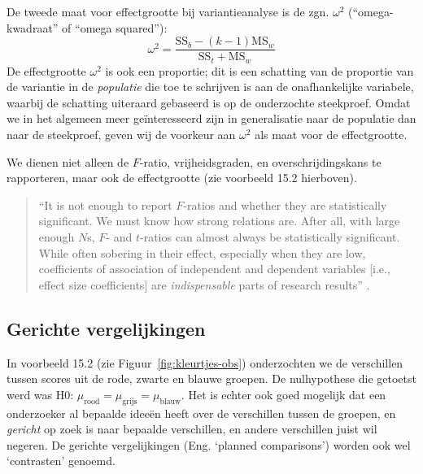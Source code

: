 \documentclass[
]{book}
\begin{document}
De tweede maat voor effectgrootte bij variantieanalyse is de zgn.
\(\omega^2\) (``omega-kwadraat'' of ``omega squared''):
\begin{equation}
  \label{eq:omegasq}
    \omega^2 = \frac{ \textrm{SS}_b - (k-1) \textrm{MS}_w} { \textrm{SS}_t + \textrm{MS}_w }
\end{equation}
De effectgrootte \(\omega^2\) is ook een proportie; dit is een schatting
van de proportie van de variantie in de \emph{populatie} die toe te schrijven
is aan de onafhankelijke variabele, waarbij de schatting uiteraard
gebaseerd is op de onderzochte steekproef. Omdat we in het algemeen meer
geïnteresseerd zijn in generalisatie naar de populatie dan naar de
steekproef, geven wij de voorkeur aan \(\omega^2\) als maat voor de
effectgrootte.

We dienen niet alleen de \(F\)-ratio, vrijheidsgraden, en
overschrijdingskans te rapporteren, maar ook de effectgrootte (zie
voorbeeld 15.2 hierboven).

\begin{quote}
``It is not enough to report
\(F\)-ratios and whether they are statistically significant. We must know
how strong relations are. After all, with large enough \(N\)s, \(F\)- and
\(t\)-ratios can almost always be statistically significant. While often
sobering in their effect, especially when they are low, coefficients of
association of independent and dependent variables {[}i.e., effect size
coefficients{]} are \emph{indispensable} parts of research results'' \citep[ p.327, nadruk toegevoegd]{KL00}.
\end{quote}

\subsection{Gerichte vergelijkingen}\label{sec:anova-oneway-gericht}

In voorbeeld 15.2 (zie
Figuur~\ref{fig:kleurtjes-obs}) onderzochten we de verschillen tussen
scores uit de rode, zwarte en blauwe groepen. De nulhypothese die
getoetst werd was H0:
\(\mu_\textrm{rood} = \mu_\textrm{grijs} = \mu_\textrm{blauw}\).
Het is
echter ook goed mogelijk dat een onderzoeker al bepaalde ideeën heeft
over de verschillen tussen de groepen, en \emph{gericht} op zoek is naar
bepaalde verschillen, en andere verschillen juist wil negeren. De
gerichte vergelijkingen (Eng. `planned comparisons') worden ook wel
`contrasten' genoemd.
\end{document}
